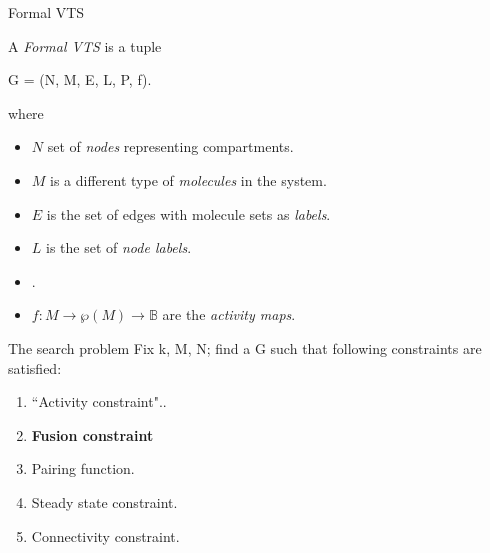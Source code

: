 \documentclass{beamer}
\theoremstyle{definition}
\theoremstyle{remark}
\newcommand{\booleans}{\mathbb{B}}
\begin{document}
	\begin{frame}{Formal VTS}
    \theoremstyle{Formal VTS}
    	A \emph{Formal VTS} is a tuple
\begin{definition}{}
G = (N, M, E, L, P, f).
\end{definition}

where
\begin{itemize}

\item $N$ set of \emph{nodes} representing compartments.

\item $M$ is a different type of \emph{molecules} in the system.

\item $E$ is the set of edges with molecule sets as \textit{labels}.

\item $L$ is the set of \emph{node labels}.
\pause

\item {}.

\item $f: M\to \wp(M) \to \booleans$ are the \emph{activity maps}. 

\end{itemize}

    \end{frame}
    
\begin{frame}{The search problem}
Fix k, M, N; find a G such that following constraints are satisfied:
\begin{enumerate}
\item {\color{blue} {``Activity constraint"}}.. \\
\item \textbf{Fusion constraint} \\
\item Pairing function. \\ 
\item Steady state constraint. \\
\item Connectivity constraint. \\
\end{enumerate}
\end{frame}
\end{document}
